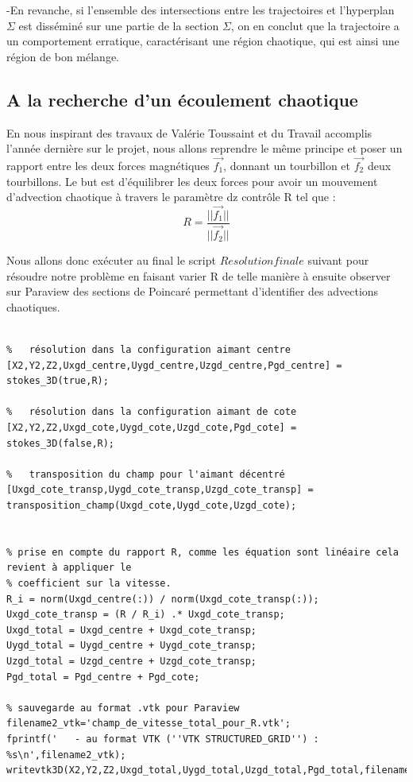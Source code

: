 \documentclass[a4paper,12pt,titlepage]{report}
\begin{document}
\begin{onehalfspace}
-En revanche, si l'ensemble des intersections entre les trajectoires et l'hyperplan $\Sigma$ est disséminé sur une partie de la section $\Sigma$, on en conclut que la trajectoire a un comportement erratique, caractérisant une région chaotique, qui est ainsi une région de bon mélange. 

\subsection{A la recherche d'un écoulement chaotique}

En nous inspirant des travaux de Valérie Toussaint et du Travail accomplis l'année dernière sur le projet, nous allons reprendre le même principe et poser un rapport entre les deux forces magnétiques $\vec{f_1}$, donnant un tourbillon et $\vec{f_2}$ deux tourbillons. Le but est d'équilibrer les deux forces pour avoir un mouvement d'advection chaotique à travers le paramètre dz contrôle R tel que :
\[ R = \frac{||\vec{f_1}||}{||\vec{f_2}||} \]

Nous allons donc exécuter au final le script $Resolution finale$ suivant pour résoudre notre problème en faisant varier R de telle manière à ensuite observer sur Paraview des sections de Poincaré permettant d'identifier des advections chaotiques.

\begin{verbatim}

%   résolution dans la configuration aimant centre
[X2,Y2,Z2,Uxgd_centre,Uygd_centre,Uzgd_centre,Pgd_centre] = stokes_3D(true,R);

%   résolution dans la configuration aimant de cote
[X2,Y2,Z2,Uxgd_cote,Uygd_cote,Uzgd_cote,Pgd_cote] = stokes_3D(false,R);

%   transposition du champ pour l'aimant décentré
[Uxgd_cote_transp,Uygd_cote_transp,Uzgd_cote_transp] = transposition_champ(Uxgd_cote,Uygd_cote,Uzgd_cote);


% prise en compte du rapport R, comme les équation sont linéaire cela revient à appliquer le 
% coefficient sur la vitesse.
R_i = norm(Uxgd_centre(:)) / norm(Uxgd_cote_transp(:));
Uxgd_cote_transp = (R / R_i) .* Uxgd_cote_transp;
Uxgd_total = Uxgd_centre + Uxgd_cote_transp;
Uygd_total = Uygd_centre + Uygd_cote_transp;
Uzgd_total = Uzgd_centre + Uzgd_cote_transp;
Pgd_total = Pgd_centre + Pgd_cote;

% sauvegarde au format .vtk pour Paraview
filename2_vtk='champ_de_vitesse_total_pour_R.vtk';
fprintf('   - au format VTK (''VTK STRUCTURED_GRID'') : %s\n',filename2_vtk);
writevtk3D(X2,Y2,Z2,Uxgd_total,Uygd_total,Uzgd_total,Pgd_total,filename2_vtk);
\end{verbatim}


\end{onehalfspace}
\end{document}

